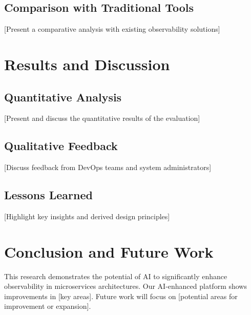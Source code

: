 \documentclass[10pt,journal,compsoc]{IEEEtran}
\begin{document}
\subsection{Comparison with Traditional Tools}
[Present a comparative analysis with existing observability solutions]

\section{Results and Discussion}
\subsection{Quantitative Analysis}
[Present and discuss the quantitative results of the evaluation]

\subsection{Qualitative Feedback}
[Discuss feedback from DevOps teams and system administrators]

\subsection{Lessons Learned}
[Highlight key insights and derived design principles]

\section{Conclusion and Future Work}
This research demonstrates the potential of AI to significantly enhance observability in microservices architectures. Our AI-enhanced platform shows improvements in [key areas]. Future work will focus on [potential areas for improvement or expansion].



\end{document}
